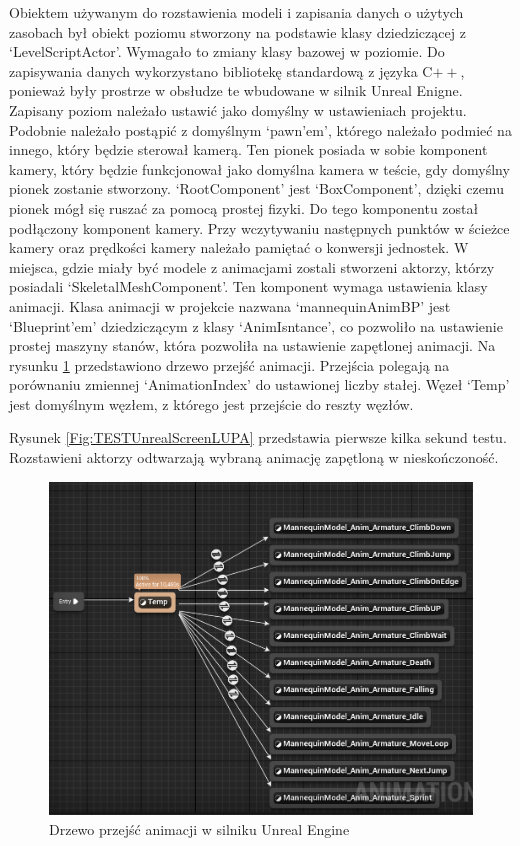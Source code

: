 \documentclass[12pt,twoside]{article}
\begin{document}
Obiektem używanym do rozstawienia modeli i zapisania danych o użytych zasobach
był obiekt poziomu stworzony na podstawie klasy dziedziczącej z
‘LevelScriptActor’. Wymagało to zmiany klasy bazowej w poziomie. Do zapisywania
danych wykorzystano bibliotekę standardową z języka C$++$, ponieważ były
prostrze w obsłudze te wbudowane w silnik Unreal Enigne. Zapisany poziom
należało ustawić jako domyślny w ustawieniach projektu. Podobnie należało
postąpić z domyślnym ‘pawn’em’, którego należało podmieć na innego, który będzie
sterował kamerą. Ten pionek posiada w sobie komponent kamery, który będzie
funkcjonował jako domyślna kamera w teście, gdy domyślny pionek zostanie
stworzony. ‘RootComponent’ jest ‘BoxComponent’, dzięki czemu pionek mógł się
ruszać za pomocą prostej fizyki. Do tego komponentu został podłączony komponent
kamery. Przy wczytywaniu następnych punktów w ścieżce kamery oraz prędkości
kamery należało pamiętać o konwersji jednostek. W miejsca, gdzie miały być
modele z animacjami zostali stworzeni aktorzy, którzy posiadali
‘SkeletalMeshComponent’. Ten komponent wymaga ustawienia klasy animacji. Klasa
animacji w projekcie nazwana ‘mannequinAnimBP’ jest ‘Blueprint’em’ dziedziczącym
z klasy ‘AnimIsntance’, co pozwoliło na ustawienie prostej maszyny stanów, która
pozwoliła na ustawienie zapętlonej animacji. 
Na rysunku \ref{Fig:UnrealManequin} przedstawiono drzewo przejść animacji.
Przejścia polegają na porównaniu zmiennej ‘AnimationIndex’ do ustawionej liczby
stałej. Węzeł ‘Temp’ jest domyślnym węzłem, z którego jest przejście do reszty
węzłów. 

Rysunek \ref{Fig:TESTUnrealScreenLUPA} przedstawia pierwsze kilka sekund testu.
Rozstawieni aktorzy odtwarzają wybraną animację zapętloną w nieskończoność. 



\begin{figure}[h]
    \centering
    \includegraphics[width=16cm]{figures/UnrealManequin.png}
    \caption{Drzewo przejść animacji w silniku Unreal Engine}
    \label{Fig:UnrealManequin}
\end{figure}     
\end{document}
